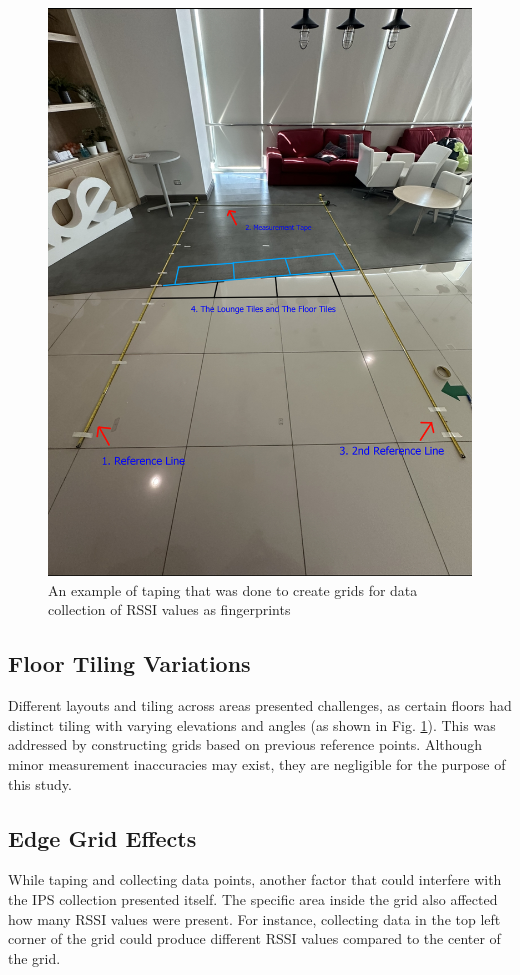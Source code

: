 \documentclass[runningheads]{llncs}
\begin{document}
\begin{figure}[!htbp]
	\centering
	\includegraphics[width=\textwidth]{meth2.jpg}
	\caption{An example of taping that was done to create grids for data collection of RSSI values as fingerprints}
	\label{fig:taping}
\end{figure}

\subsection{Floor Tiling Variations}
Different layouts and tiling across areas presented challenges, as certain floors had distinct tiling with varying elevations and angles (as shown in Fig. \ref{fig:taping}). This was addressed by constructing grids based on previous reference points. Although minor measurement inaccuracies may exist, they are negligible for the purpose of this study.

\subsection{Edge Grid Effects}
While taping and collecting data points, another factor that could interfere with the IPS collection presented itself. The specific area inside the grid also affected how many RSSI values were present. For instance, collecting data in the top left corner of the grid could produce different RSSI values compared to the center of the grid. 
\end{document}
